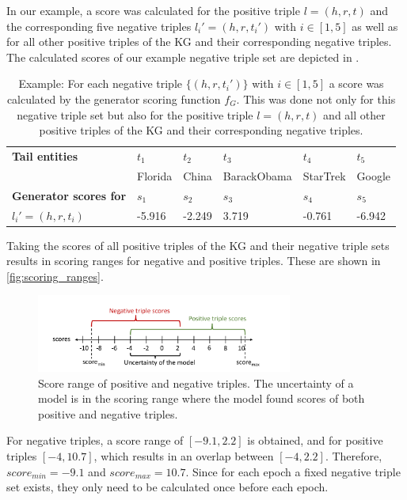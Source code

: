 In our example, a score was calculated for the positive triple $l = (h,r,t)$ and the corresponding five negative triples $l_i' = (h,r,t_i')$  with $i \in [1,5]$ as well as for all other positive triples of the \ac{KG} and their corresponding negative triples.
The calculated scores of our example negative triple set are depicted in .
\begin{table}[h]
    \centering
    \begin{tabular}{llllll}
        \toprule
        
        \textbf{Tail entities}
        & \textbf{$t_1$} & \textbf{$t_2$} & \textbf{$t_3$} & \textbf{$t_4$} & \textbf{$t_5$} \\
         
        & Florida
        & China
        & BarackObama
        & StarTrek
        & Google  \\

        \midrule
        
        \textbf{Generator scores for}
        & $s_1$ & $s_2$ & $s_3$ & $s_4$ & $s_5$ \\
       
        
        \textbf{$l_i' = (h, r, t_i)$}
        & -5.916 
        & -2.249  
        & 3.719 
        & -0.761 
        & -6.942\\ 
        
        \bottomrule
        
    \end{tabular}
    \caption{Example: For each negative triple
    $\{(h,r,t_i')\}$ with $i \in [1,5]$ a score was calculated by the generator scoring function $f_G$.
    This was done not only for this negative triple set but also for the positive triple $l = (h,r,t)$ and all other positive triples of the KG and their corresponding negative triples.}
\label{tab:generator_scores_of_neg}
\end{table}
Taking the scores of all positive triples of the \ac{KG} and their negative triple sets results in scoring ranges for negative and positive triples.
These are shown in \autoref{fig:scoring_ranges}.
\begin{figure}[H]
  \centering
    \includegraphics[width=0.75\textwidth]{figures/scoremin_scoremax_example.pdf}
  \caption{Score range of positive and negative triples.
  The uncertainty of a model is in the scoring range where the model found scores of both positive and negative triples.}
  \label{fig:scoring_ranges}
\end{figure}
For negative triples, a score range of $[-9.1, 2.2]$ is obtained, and for positive triples $[-4, 10.7]$, which results in an overlap between $[-4, 2.2]$.
Therefore, $score_{min} = -9.1$ and $score_{max} = 10.7$.
Since for each epoch a fixed negative triple set exists, they only need to be calculated once before each epoch.
